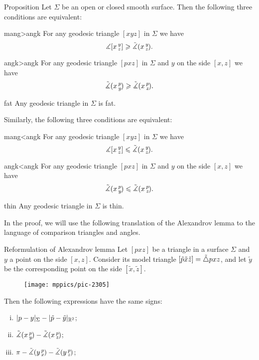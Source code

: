 \begin{thm}{Proposition}\label{prop:comp-reformulations}
Let $\Sigma$ be an open or closed smooth surface.
Then the following three conditions are equivalent:

\begin{subthm}{mang>angk}
For any geodesic triangle $[xyz]$ in $\Sigma$ we have
 \[\measuredangle[x\,{}^{y}_{z}]\geqslant\tilde\measuredangle(x\,{}^{y}_{z}\hspace{-0.2ex}).\]
\end{subthm}

\begin{subthm}{angk>angk} For any geodesic triangle $[pxz]$ in $\Sigma$ and $y$ on the side $[x,z]$ we have
 \[\tilde\measuredangle(x\,{}^{p}_{y}\hspace{-0.2ex}) \geqslant \tilde\measuredangle(x\,{}^{p}_{z}\hspace{-0.2ex}).\]
 
\end{subthm}

\begin{subthm}{fat}
 Any geodesic triangle in $\Sigma$ is fat.
\end{subthm}

\medskip

Similarly, the following three conditions are equivalent:

\begin{subthmA}{mang<angk}
For any geodesic triangle $[xyz]$ in $\Sigma$ we have
 \[\measuredangle[x\,{}^{y}_{z}]\leqslant\tilde\measuredangle(x\,{}^{y}_{z}\hspace{-0.2ex}).\]
\end{subthmA}

\begin{subthmA}{angk<angk} For any geodesic triangle $[pxz]$ in $\Sigma$ and $y$ on the side $[x,z]$ we have
 \[\tilde\measuredangle(x\,{}^{p}_{y}\hspace{-0.2ex}) \leqslant \tilde\measuredangle(x\,{}^{p}_{z}\hspace{-0.2ex}).\]
\end{subthmA}

\begin{subthmA}{thin}
Any geodesic triangle in $\Sigma$ is thin.
\end{subthmA}

\end{thm}

In the proof, we will use the following translation of the Alexandrov lemma to the language of comparison triangles and angles.

\begin{thm}{Reformulation of Alexandrov lemma}\label{lem:alex-reformulation}
Let $[pxz]$ be a triangle in a surface $\Sigma$
and $y$ a point on the side $[x,z]$.
Consider its model triangle $[\tilde p\tilde x\tilde z]\z=\tilde\triangle pxz$, and let $\tilde y$ be the corresponding point on the side $[\tilde x,\tilde z]$.

\begin{wrapfigure}{r}{25mm}
\vskip-2mm
\centering
\texttt{[image: mppics/pic-2305]}
\end{wrapfigure}

Then the following expressions have the same signs:
\begin{enumerate}[(i)]
 \item $\dist{p}{y}\Sigma-\dist{\tilde p}{\tilde y}{\mathbb{R}^2}$;
 \item $\tilde\measuredangle(x\,{}^{p}_{y}\hspace{-0.2ex})-\tilde\measuredangle(x\,{}^{p}_{z}\hspace{-0.2ex})$;
 \item $\pi-\tilde\measuredangle(y\,{}^{p}_{x}\hspace{-0.2ex})-\tilde\measuredangle(y\,{}^{p}_{z}\hspace{-0.2ex})$;
\end{enumerate}
\end{thm}

